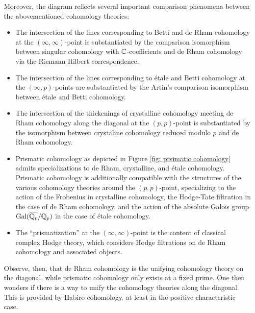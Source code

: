 Moreover, the diagram reflects several important comparison phenomena between the abovementioned cohomology theories:
\begin{itemize}
    \item The intersection of the lines corresponding to Betti and de Rham cohomology at the $(\infty,\infty)$-point is substantiated by the comparison isomorphism between singular cohomology with $\mathbb{C}$-coefficients and de Rham cohomology via the Riemann-Hilbert correspondence. 
    \item The intersection of the lines corresponding to \'{e}tale and Betti cohomology at the $(\infty,p)$-points are substantiated by the Artin's comparison isomorphism between \'{e}tale and Betti cohomology. 
    \item The intersection of the thickenings of crystalline cohomology meeting de Rham cohomology along the diagonal at the $(p,p)$-point is substantiated by the isomorphism between crystaline cohomology reduced modulo $p$ and de Rham cohomology.
    \item Prismatic cohomology as depicted in Figure \ref{fig: prsimatic cohomology} admits specializations to de Rham, crystalline, and \'{e}tale cohomology. Prismatic cohomology is additionally compatible with the structures of the various cohomology theories around the $(p,p)$-point, specializing to the action of the Frobenius in crystalline cohomology, the Hodge-Tate filtration in the case of de Rham cohomology, and the action of the absolute Galois group $\mathrm{Gal}(\overline{\mathbb{Q}_{p}}/\mathbb{Q}_{p})$ in the case of \'{e}tale cohomology.  
    \item The ``prismatization'' at the $(\infty,\infty)$-point is the content of classical complex Hodge theory, which considers Hodge filtrations on de Rham cohomology and associated objects. 
\end{itemize}
Observe, then, that de Rham cohomology is the unifying cohomology theory on the diagonal, while prismatic cohomology only exists at a fixed prime. One then wonders if there is a way to unify the cohomology theories along the diagonal. This is provided by Habiro cohomology, at least in the positive characteristic case.
